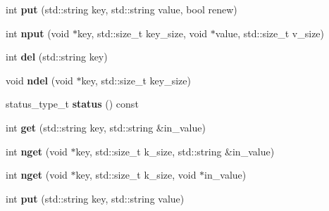\begin{DoxyCompactItemize}
\item 
\mbox{\label{structmods_1_1lmdb_1_1__db__handle_adb4c07593c271ae3a064a305a2e0fb63}} 
int {\bfseries put} (std\+::string key, std\+::string value, bool renew)
\item 
\mbox{\label{structmods_1_1lmdb_1_1__db__handle_a0ed32a4279b6f5d2208bd0b9304cee35}} 
int {\bfseries nput} (void $\ast$key, std\+::size\+\_\+t key\+\_\+size, void $\ast$value, std\+::size\+\_\+t v\+\_\+size)
\item 
\mbox{\label{structmods_1_1lmdb_1_1__db__handle_a099cccc7f73edc949771274ba8ecaa13}} 
int {\bfseries del} (std\+::string key)
\item 
\mbox{\label{structmods_1_1lmdb_1_1__db__handle_afed682f1c1b4481e3d94785a96c361bb}} 
void {\bfseries ndel} (void $\ast$key, std\+::size\+\_\+t key\+\_\+size)
\item 
\mbox{\label{structmods_1_1lmdb_1_1__db__handle_a84c388c496a013ecc2e46fec23d5e7c4}} 
status\+\_\+type\+\_\+t {\bfseries status} () const
\item 
\mbox{\label{structmods_1_1lmdb_1_1__db__handle_a7087d7d0a9cf7476492f89baedd97a36}} 
int {\bfseries get} (std\+::string key, std\+::string \&in\+\_\+value)
\item 
\mbox{\label{structmods_1_1lmdb_1_1__db__handle_a2d6b287c6a1c63139df32e26bd8531cd}} 
int {\bfseries nget} (void $\ast$key, std\+::size\+\_\+t k\+\_\+size, std\+::string \&in\+\_\+value)
\item 
\mbox{\label{structmods_1_1lmdb_1_1__db__handle_a60ac3fa83da7725016dab8fbe5ca4094}} 
int {\bfseries nget} (void $\ast$key, std\+::size\+\_\+t k\+\_\+size, void $\ast$in\+\_\+value)
\item 
\mbox{\label{structmods_1_1lmdb_1_1__db__handle_a84218a2943429838fc41d027b2131089}} 
int {\bfseries put} (std\+::string key, std\+::string value)

\end{DoxyCompactItemize}
